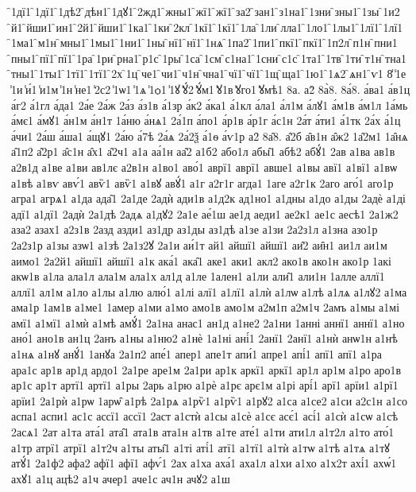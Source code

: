 {̑1дї1
̑1дї1
̑1дѣ2
̑дѣн1
̑1дꙋ1
̑2жд1
̑жны1
̑жї1
̑жї1
̑за2
̑зан1
̑з1на1
̑1зни
̑зны1
̑1зы
̑1и2
̑й1
̑йши1
̑ин1
̑2й1
̑йши1
̑1ка1
̑1ки
̑2кл
̑1кї1
̑1кї1
̑1ла
̑1ли
̑лла1
̑1ло1
̑1лы1
̑1лї1
̑1лї1
̑1ма1
̑м1н
̑мны1
̑1мы1
̑1ни1
̑1ны
̑нї1
̑нї1
̑1нѧ
̑1па2
̑1пи1
̑пкї1
̑пкї1
̑1п2л
̑п1н
̑пни1
̑пны1
̑пї1
̑пї1
̑1ра
̑1ри
̑рна1
̑р1с
̑1ры
̑1са
̑1см
̑с1на1
̑1сни
̑с1с
̑1та1
̑1тв
̑1ти
̑т1н
̑тна1
̑тны1
̑1ты1
̑1тї1
̑1тї1
̑2х
̑1ц
̑че1
̑чи1
̑ч1н
̑чна1
̑чї1
̑чї1
̑1щ
̑ща1
̑1ю1
̑1ѧ2
̑ѧн1
̑ѵ1
8̾
̾1е
̾1и
̾и́1
̾и1м
̾1н
̾не1
̾2с2
̾1ѡ1
̾1ѧ
̾1ѻ1
̾1ꙋ
̾ꙋ́2
̾ꙋ́м1
̾ꙋ1в
̾ꙋго1
̾ꙋмѣ1
8а.
а2̀
8а̀8.
8а́8.
а́ва1
а́в1ц
а́г2
а́1гл
а́да1
2а́е
2а́ж
2а́з
а́з1в
а́1зр
а́к2
а́ка1
а́1кл
а́ла1
а́л1м
а́лꙋ1
а́м1в
а́м1л
1а́мь
а́мє1
а́мꙋ1
а́н1м
а́н1т
1а́ню
а́нѧ1
2а́1п
а́по1
а́р1в
а́р1г
а́с1н
2а́т
а́ти1
а́1тк
2а́х
а́1ц
а́чи1
2а́ш
а́ша1
а́щꙋ1
2а́ю
а́7ѣ
2а́ѧ
2а́2ѯ
а́1ѳ
а́ѵ1р
а2̑
8а̑8.
а̑2б
а̑в1н
а̑ж2
1а̑2м1
1а̑нѧ
а̑1п2
а̑2р1
а̑с1н
а̑х1
а̑2ч1
а1а
аа́1н
аа̑2
а1б2
або1л
абы̑1
абѣ2
абꙋ́1
2ав
а1ва
ав1в
а2в1д
а1ве
а1ви
ав1лє
а2в1н
а1во1
аво́1
аврї1
аврї1
авше1
а1вы
авї1
а1вї1
а1вѡ
а1вѣ
а1вѵ
авѵ́1
авѷ1
авѷ1
а1вꙋ
авꙋ́1
а1г
а2г1г
агда1
1аге
а2г1к
2аго
аго́1
аго1р
агра1
агрѧ1
а1да
ада̑1
2а1де
2адѝ
ади1в
а1д2к
ад1но1
а1дны
а1до
а1ды
2адѐ
а1ді
адї1
а1дї1
2адѝ
2а1дѣ
2адѧ
а1дꙋ2
2а1е
ае́1ш
ае1д
аеди1
ае2к1
ае1с
аесѣ1
2а1ж2
аза2
азах1
а2з1в
2азд
азди1
аз1др
аз1ды
аз1дѣ
а1зе
а1зи
2а2з1л
а1зна
азо1р
2а2з1р
а1зы
азѡ1
а1зѣ
2а1з2ꙋ
2а1и
аи́1т
ай1
айшї1
айшї1
аи̑2
аи̑н1
аи1л
аи1м
аимо1
2а2й1
айшї1
айшї1
а1к
ака́1
ака̑1
аке1
аки1
акл2
ако1в
ако1н
ако1р
1акі
акѡ1в
а1ла
ала1л
ала1м
ала1х
ал1д
а1ле
1ален1
а1ли
али̑1
али1н
1алле
аллї1
аллї1
ал1м
а1ло
а1лы
а1лю
алю́1
а1лі
алї1
а1лї1
а1лѝ
а1лѡ
а1лѣ
а1лѧ
а1лꙋ2
а1ма
ама1р
1ам1в
а1ме1
1амер
а1ми
а1мо
амо1в
амо1м
а2м1п
а2м1ч
2амъ
а1мы
а1мі
амї1
а1мї1
а1мѝ
а1мѣ
амꙋ́1
2а1на
анас1
ан1д
а1не2
2а1ни
1анні
аннї1
аннї1
а1но
ано́1
ано1в
ан1ц
2анъ
а1ны
а1ню2
а1нѐ
1а1ні
ані́1
2анї1
2анї1
а1нѝ
анѡ1н
а1нѣ
а1нѧ
а1нꙋ
анꙋ́1
1анꙋа
2а1п2
апе́1
апер1
апе1т
апи́1
апре1
апі́1
апї1
апї1
а1ра
ара1с
ар1в
ар1д
ардо1
2а1ре
аре1м
2а1ри
ар1к
аркї1
аркї1
ар1л
ар1м
а1ро
аро1в
ар1с
ар1т
артї1
артї1
а1ры
2арь
а1рю
а1рѐ
а1рє
арє1м
а1рі
арі́1
арї1
арїи1
а1рї1
арїи1
2а1рѝ
а1рѡ
1арѡ̑
а1рѣ
2а1рѧ
а1рѷ1
а1рѷ1
а1рꙋ2
а1са
а1се2
а1си
а2с1н
а1со
аспа1
аспи1
ас1с
ассї1
ассї1
2аст
а1стѝ
а1сы
а1сѐ
а1сє
асє́1
асі́1
а1сѝ
а1сѡ
а1сѣ
2асѧ1
2ат
а1та
ата́1
ата̑1
ата1в
ата1н
а1тв
а1те
ате́1
а1ти
ати1л
а1т2л
а1то
ато́1
а1тр
атрї1
атрї1
а1т2ч
а1ты
аты̑1
а1ті
аті́1
атї1
а1тї1
а1тѝ
а1тѡ
а1тѣ
а1тѧ
а1тꙋ
атꙋ́1
2а1ф2
афа2
афї1
афї1
афѵ́1
2ах
а1ха
аха́1
аха1л
а1хи
а1хо
а1х2т
ахі́1
ахѡ́1
ахꙋ1
а1ц
ацѣ2
а1ч
ачер1
аче1с
ач1н
ачꙋ2
а1ш
}
